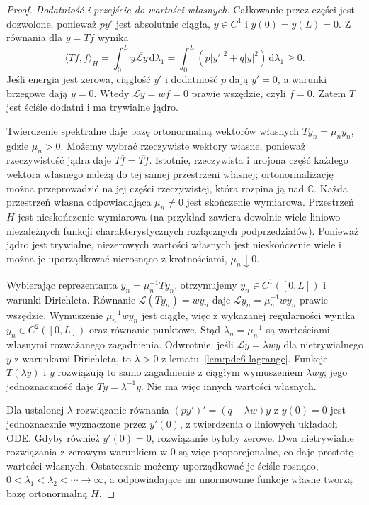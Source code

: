 \begin{proof}
\emph{Dodatniość i przejście do wartości własnych.}
Całkowanie przez części jest dozwolone, ponieważ
$py'$ jest absolutnie ciągła, $y\in C^1$ i $y(0)=y(L)=0$.
Z równania dla $y=Tf$ wynika
\[
 \langle Tf,f\rangle_H
 =\int_0^L y\overline{\mathcal Ly}\,\mathrm d\lambda_1
 =\int_0^L(p|y'|^2+q|y|^2)\,\mathrm d\lambda_1\ge0.
\]
Jeśli energia jest zerowa, ciągłość $y'$ i dodatniość $p$
dają $y'=0$, a warunki brzegowe dają $y=0$.
Wtedy $\mathcal Ly=wf=0$ prawie wszędzie, czyli $f=0$.
Zatem $T$ jest ściśle dodatni i ma trywialne jądro.

Twierdzenie spektralne daje bazę ortonormalną
wektorów własnych $Ty_n=\mu_n y_n$, gdzie $\mu_n>0$.
Możemy wybrać rzeczywiste wektory własne, ponieważ
rzeczywistość jądra daje $T\overline f=\overline{Tf}$.
Istotnie, rzeczywista i urojona część każdego wektora
własnego należą do tej samej przestrzeni własnej;
ortonormalizację można przeprowadzić na jej części
rzeczywistej, która rozpina ją nad $\mathbb C$.
Każda przestrzeń własna odpowiadająca $\mu_n\ne0$
jest skończenie wymiarowa.
Przestrzeń $H$ jest nieskończenie wymiarowa (na przykład
zawiera dowolnie wiele liniowo niezależnych funkcji
charakterystycznych rozłącznych podprzedziałów).
Ponieważ jądro jest trywialne, niezerowych wartości
własnych jest nieskończenie wiele i można je uporządkować
nierosnąco z krotnościami, $\mu_n\downarrow0$.

Wybierając reprezentanta $y_n=\mu_n^{-1}Ty_n$,
otrzymujemy $y_n\in C^1([0,L])$ i warunki Dirichleta.
Równanie $\mathcal L(Ty_n)=wy_n$ daje
$\mathcal Ly_n=\mu_n^{-1}wy_n$ prawie wszędzie.
Wymuszenie $\mu_n^{-1}wy_n$ jest ciągłe, więc
z wykazanej regularności wynika $y_n\in C^2([0,L])$
oraz równanie punktowe. Stąd $\lambda_n=\mu_n^{-1}$
są wartościami własnymi rozważanego zagadnienia.
Odwrotnie, jeśli $\mathcal Ly=\lambda wy$ dla
nietrywialnego $y$ z warunkami Dirichleta, to
$\lambda>0$ z lematu~\ref{lem:pde6-lagrange}.
Funkcje $T(\lambda y)$ i $y$ rozwiązują to samo
zagadnienie z ciągłym wymuszeniem $\lambda wy$;
jego jednoznaczność daje $Ty=\lambda^{-1}y$.
Nie ma więc innych wartości własnych.

Dla ustalonej $\lambda$ rozwiązanie równania
$(py')'=(q-\lambda w)y$ z $y(0)=0$ jest jednoznacznie
wyznaczone przez $y'(0)$, z twierdzenia o liniowych
układach ODE. Gdyby również $y'(0)=0$, rozwiązanie
byłoby zerowe. Dwa nietrywialne rozwiązania z zerowym
warunkiem w $0$ są więc proporcjonalne, co daje
prostotę wartości własnych. Ostatecznie możemy
uporządkować je ściśle rosnąco,
$0<\lambda_1<\lambda_2<\cdots\to\infty$,
a odpowiadające im unormowane funkcje własne
tworzą bazę ortonormalną $H$.
\end{proof}

